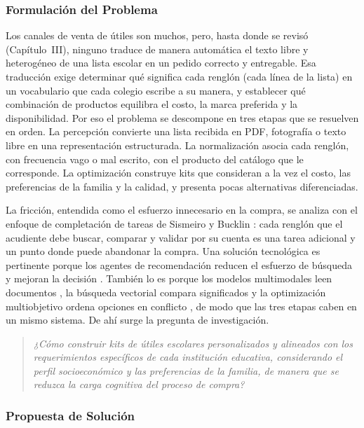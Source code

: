 \subsubsection{Formulación del Problema}

Los canales de venta de útiles son muchos, pero, hasta donde se revisó (Capítulo~III), ninguno traduce de
manera automática el texto libre y heterogéneo de una lista escolar en un pedido correcto y entregable. Esa
traducción exige determinar qué significa cada renglón (cada línea de la lista) en un vocabulario que cada
colegio escribe a su manera, y establecer qué
combinación de productos equilibra el costo, la marca preferida y la disponibilidad. Por eso el problema se
descompone en tres etapas que se resuelven en orden. La percepción convierte una lista recibida en PDF,
fotografía o texto libre en una representación estructurada. La normalización asocia cada renglón, con
frecuencia vago o mal escrito, con el producto del catálogo que le corresponde. La optimización construye
kits que consideran a la vez el costo, las preferencias de la familia y la calidad, y presenta pocas
alternativas diferenciadas.\par

La fricción, entendida como el esfuerzo innecesario en la compra, se analiza con el enfoque de completación
de tareas de Sismeiro y Bucklin \citep{sismeiro_modeling_2004}: cada renglón que el acudiente debe buscar,
comparar y validar por su cuenta es una tarea adicional y un punto donde puede abandonar la compra. Una
solución tecnológica es pertinente porque los agentes de recomendación reducen el esfuerzo de búsqueda y
mejoran la decisión \citep{haubl_consumer_2000}. También lo es porque los modelos multimodales leen
documentos \citep{shen_ocr_2026}, la búsqueda vectorial compara significados \citep{karpukhin_dense_2020} y la
optimización multiobjetivo ordena opciones en conflicto \citep{deb_fast_2002}, de modo que las tres etapas
caben en un mismo sistema. De ahí surge la pregunta de
investigación.\par

\begin{quote}
\itshape ¿Cómo construir kits de útiles escolares personalizados y alineados con los
requerimientos específicos de cada institución educativa, considerando el perfil
socioeconómico y las preferencias de la familia, de manera que se reduzca la carga cognitiva
del proceso de compra?
\end{quote}

\subsubsection{Propuesta de Solución}

